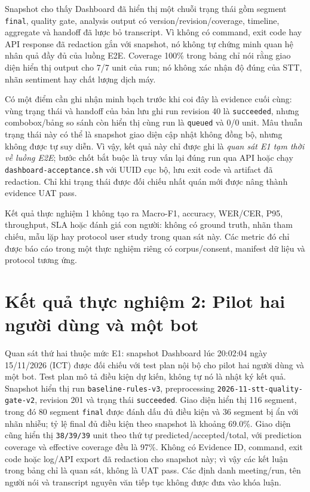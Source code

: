 Snapshot cho thấy Dashboard đã hiển thị một chuỗi trạng thái gồm segment \texttt{final}, quality gate, analysis output có version/revision/coverage, timeline, aggregate và handoff đã lược bỏ transcript. Vì không có command, exit code hay API response đã redaction gắn với snapshot, nó không tự chứng minh quan hệ nhân quả đầy đủ của luồng E2E. Coverage 100\% trong bảng chỉ nói rằng giao diện hiển thị output cho 7/7 unit của run; nó không xác nhận độ đúng của STT, nhãn sentiment hay chất lượng dịch máy.

Có một điểm cần ghi nhận minh bạch trước khi coi đây là evidence cuối cùng: vùng trạng thái và handoff của bản lưu ghi run revision 40 là \texttt{succeeded}, nhưng combobox/bảng so sánh còn hiển thị cùng run là \texttt{queued} và 0/0 unit. Mâu thuẫn trạng thái này có thể là snapshot giao diện cập nhật không đồng bộ, nhưng không được tự suy diễn. Vì vậy, kết quả này chỉ được ghi là \emph{quan sát E1 tạm thời về luồng E2E}; bước chốt bắt buộc là truy vấn lại đúng run qua API hoặc chạy \texttt{dashboard-acceptance.sh} với UUID cục bộ, lưu exit code và artifact đã redaction. Chỉ khi trạng thái được đối chiếu nhất quán mới được nâng thành evidence UAT pass.

Kết quả thực nghiệm 1 không tạo ra Macro-F1, accuracy, WER/CER, P95, throughput, SLA hoặc đánh giá con người: không có ground truth, nhãn tham chiếu, mẫu lặp hay protocol user study trong quan sát này. Các metric đó chỉ được báo cáo trong một thực nghiệm riêng có corpus/consent, manifest dữ liệu và protocol tương ứng.

\section{Kết quả thực nghiệm 2: Pilot hai người dùng và một bot}
\label{sec:experiment-result-02}

Quan sát thứ hai thuộc mức E1: snapshot Dashboard lúc 20:02:04 ngày 15/11/2026 (ICT) được đối chiếu với test plan nội bộ cho pilot hai người dùng và một bot. Test plan mô tả điều kiện dự kiến, không tự nó là nhật ký kết quả. Snapshot hiển thị run \texttt{baseline-rules-v3}, preprocessing \texttt{2026-11-stt-quality-gate-v2}, revision 201 và trạng thái \texttt{succeeded}. Giao diện hiển thị 116 segment, trong đó 80 segment \texttt{final} được đánh dấu đủ điều kiện và 36 segment bị ẩn với nhãn nhiễu; tỷ lệ final đủ điều kiện theo snapshot là khoảng 69.0\%. Giao diện cũng hiển thị \texttt{38/39/39} unit theo thứ tự predicted/accepted/total, với prediction coverage và effective coverage đều là 97\%. Không có Evidence ID, command, exit code hoặc log/API export đã redaction cho snapshot này; vì vậy các kết luận trong bảng chỉ là quan sát, không là UAT pass. Các định danh meeting/run, tên người nói và transcript nguyên văn tiếp tục không được đưa vào khóa luận.

